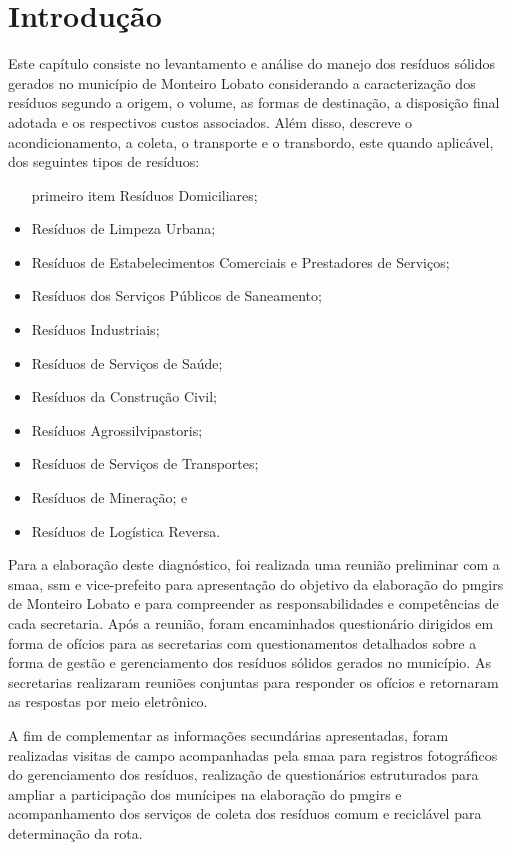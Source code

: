 	\thispagestyle{headfootimage}
	\section*{Introdução}
	
	Este capítulo consiste no levantamento e análise do manejo dos resíduos sólidos gerados no município de Monteiro Lobato considerando a caracterização dos resíduos segundo a origem, o volume, as formas de destinação, a disposição final adotada e os respectivos custos associados. Além disso, descreve o acondicionamento, a coleta, o transporte e o transbordo, este quando aplicável, dos seguintes tipos de resíduos:
	
	\begin{itemize}
		\item [primeiro item] Resíduos Domiciliares;
		\item Resíduos de Limpeza Urbana;
		\item Resíduos de Estabelecimentos Comerciais e Prestadores de Serviços;
		\item Resíduos dos Serviços Públicos de Saneamento;
		\item Resíduos Industriais;
		\item Resíduos de Serviços de Saúde;
		\item Resíduos da Construção Civil;
		\item Resíduos Agrossilvipastoris;
		\item Resíduos de Serviços de Transportes; 
		\item Resíduos de Mineração; e
		\item Resíduos de Logística Reversa.
	\end{itemize}
	
	Para a elaboração deste diagnóstico, foi realizada uma reunião preliminar com a \gls{smaa}, \gls{ssm} e vice-prefeito para apresentação do objetivo da elaboração do \gls{pmgirs} de Monteiro Lobato e para compreender as responsabilidades e competências de cada secretaria. Após a reunião, foram encaminhados questionário dirigidos em forma de ofícios para as secretarias com questionamentos detalhados sobre a forma de gestão e gerenciamento dos resíduos sólidos gerados no município. As secretarias realizaram reuniões conjuntas para responder os ofícios e retornaram as respostas por meio eletrônico.
	
	A fim de complementar as informações secundárias apresentadas, foram realizadas visitas de campo acompanhadas pela \gls{smaa} para registros fotográficos do gerenciamento dos resíduos, realização de questionários estruturados para ampliar a participação dos munícipes na elaboração do \gls{pmgirs} e acompanhamento dos serviços de coleta dos resíduos comum e reciclável para determinação da rota.
	

